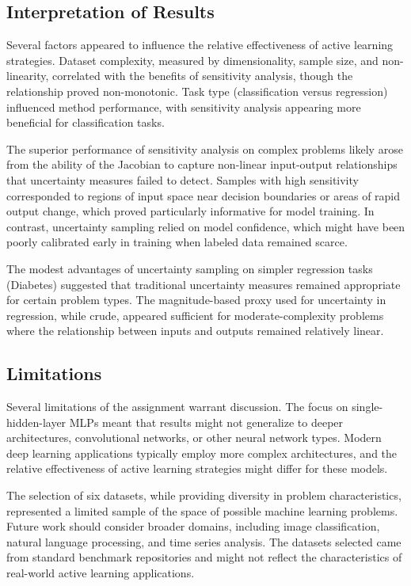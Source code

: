 \documentclass[conference]{IEEEtran}
\begin{document}
\subsection{Interpretation of Results}

Several factors appeared to influence the relative effectiveness of active learning strategies. Dataset complexity, measured by dimensionality, sample size, and non-linearity, correlated with the benefits of sensitivity analysis, though the relationship proved non-monotonic. Task type (classification versus regression) influenced method performance, with sensitivity analysis appearing more beneficial for classification tasks.

The superior performance of sensitivity analysis on complex problems likely arose from the ability of the Jacobian to capture non-linear input-output relationships that uncertainty measures failed to detect. Samples with high sensitivity corresponded to regions of input space near decision boundaries or areas of rapid output change, which proved particularly informative for model training. In contrast, uncertainty sampling relied on model confidence, which might have been poorly calibrated early in training when labeled data remained scarce.

The modest advantages of uncertainty sampling on simpler regression tasks (Diabetes) suggested that traditional uncertainty measures remained appropriate for certain problem types. The magnitude-based proxy used for uncertainty in regression, while crude, appeared sufficient for moderate-complexity problems where the relationship between inputs and outputs remained relatively linear.

\subsection{Limitations}

Several limitations of the assignment warrant discussion. The focus on single-hidden-layer MLPs meant that results might not generalize to deeper architectures, convolutional networks, or other neural network types. Modern deep learning applications typically employ more complex architectures, and the relative effectiveness of active learning strategies might differ for these models.

The selection of six datasets, while providing diversity in problem characteristics, represented a limited sample of the space of possible machine learning problems. Future work should consider broader domains, including image classification, natural language processing, and time series analysis. The datasets selected came from standard benchmark repositories and might not reflect the characteristics of real-world active learning applications.
\end{document}
